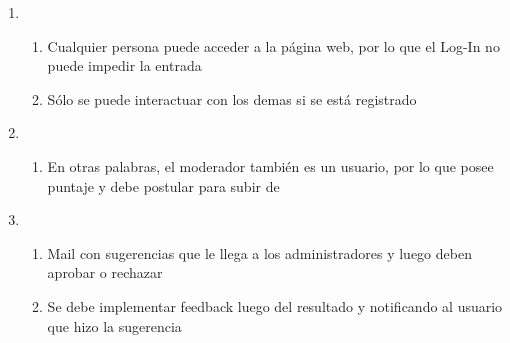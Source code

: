 \documentclass[12pt, letterpaper, notitlepage]{article}
\begin{document}
\begin{enumerate}
	\item {}
		\begin{enumerate}
			\item Cualquier persona puede acceder a la página web, por lo que el Log-In no puede impedir la entrada
			\item Sólo se puede interactuar con los demas si se está registrado
		\end{enumerate}				
		
	\item {}
		\begin{enumerate}
			\item En otras palabras, el moderador también es un usuario, por lo que posee puntaje y debe postular para subir de 
		\end{enumerate}
	
	\item {}
		\begin{enumerate}
			\item Mail con sugerencias que le llega a los administradores y luego deben aprobar o rechazar
			\item Se debe implementar feedback luego del resultado y notificando al usuario que hizo la sugerencia
		\end{enumerate}			
	
\end{enumerate}
\end{document}
